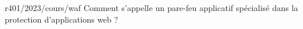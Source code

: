 \begin{question}{r401/2023/cours/waf}
  Comment s'appelle un pare-feu applicatif spécialisé dans la
  protection d'applications web ?
  \begin{reponseshoriz}
  \end{reponseshoriz}
\end{question}
